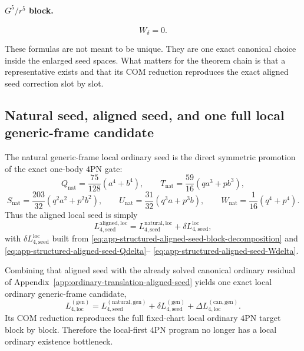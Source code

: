 \documentclass[11pt]{article}
\begin{document}
\paragraph{$G^5/r^5$ block.}
\begin{equation}
W_\delta=0.
\label{eq:app-structured-aligned-seed-Wdelta}
\end{equation}

These formulas are not meant to be unique.  They are one exact canonical choice
inside the enlarged seed spaces.  What matters for the theorem chain is that a
representative exists and that its COM reduction reproduces the exact aligned
seed correction slot by slot.

\subsection{Natural seed, aligned seed, and one full local generic-frame candidate}
\label{app:structured-aligned-seed-full-candidate}

The natural generic-frame local ordinary seed is the direct symmetric promotion
of the exact one-body $4$PN gate:
\begin{equation}
Q_{\mathrm{nat}}=\frac{75}{128}(a^4+b^4),
\qquad
T_{\mathrm{nat}}=\frac{59}{16}(qa^3+pb^3),
\label{eq:app-structured-aligned-seed-natural-seed-a}
\end{equation}
\begin{equation}
S_{\mathrm{nat}}=\frac{203}{32}(q^2a^2+p^2b^2),
\qquad
U_{\mathrm{nat}}=\frac{31}{32}(q^3a+p^3b),
\qquad
W_{\mathrm{nat}}=\frac{1}{16}(q^4+p^4).
\label{eq:app-structured-aligned-seed-natural-seed-b}
\end{equation}
Thus the aligned local seed is simply
\begin{equation}
L_{4,\mathrm{seed}}^{\mathrm{aligned,loc}}
=
L_{4,\mathrm{seed}}^{\mathrm{natural,loc}}
+
\delta L_{4,\mathrm{seed}}^{\mathrm{loc}},
\label{eq:app-structured-aligned-seed-aligned-seed}
\end{equation}
with $\delta L_{4,\mathrm{seed}}^{\mathrm{loc}}$ built from
\eqref{eq:app-structured-aligned-seed-block-decomposition} and
\eqref{eq:app-structured-aligned-seed-Qdelta}--
\eqref{eq:app-structured-aligned-seed-Wdelta}.

Combining that aligned seed with the already solved canonical ordinary residual
of Appendix~\ref{app:ordinary-translation-aligned-seed} yields one exact local
ordinary generic-frame candidate,
\begin{equation}
\boxed{
L_{4,\mathrm{loc}}^{(\mathrm{gen})}
=
L_{4,\mathrm{seed}}^{(\mathrm{natural,gen})}
+
\delta L_{4,\mathrm{seed}}^{(\mathrm{gen})}
+
\Delta L_{4,\mathrm{loc}}^{(\mathrm{can,gen})}.
}
\label{eq:app-structured-aligned-seed-full-local-candidate}
\end{equation}
Its COM reduction reproduces the full fixed-chart local ordinary $4$PN target
block by block.  Therefore the local-first $4$PN program no longer has a local
ordinary existence bottleneck.
\end{document}

